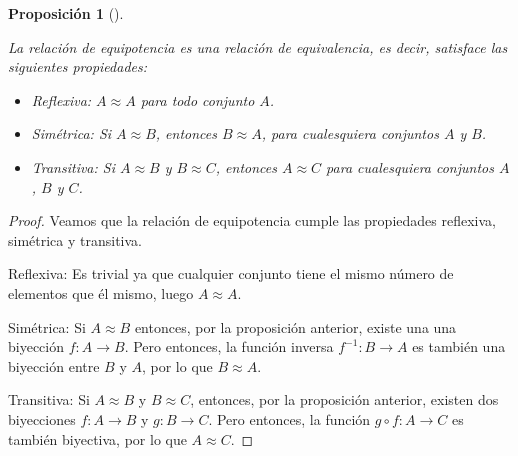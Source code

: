 \documentclass[
  a4paper,
]{scrreport}
\providecommand{\tightlist}{%
  \setlength{\itemsep}{0pt}\setlength{\parskip}{0pt}}\usepackage{longtable,booktabs,array}
\theoremstyle{definition}
\theoremstyle{plain}
\theoremstyle{plain}
\newtheorem{proposition}{Proposición}[chapter]
\theoremstyle{definition}
\theoremstyle{definition}
\theoremstyle{plain}
\theoremstyle{remark}
\begin{document}
\begin{proposition}[]\protect\hypertarget{prp-equipotencia-relacion-equivalencia}{}\label{prp-equipotencia-relacion-equivalencia}

La relación de equipotencia es una relación de equivalencia, es decir,
satisface las siguientes propiedades:

\begin{itemize}
\tightlist
\item
  \emph{Reflexiva:} \(A\approx A\) para todo conjunto \(A\).
\item
  \emph{Simétrica:} Si \(A\approx B\), entonces \(B\approx A\), para
  cualesquiera conjuntos \(A\) y \(B\).
\item
  \emph{Transitiva:} Si \(A\approx B\) y \(B\approx C\), entonces
  \(A\approx C\) para cualesquiera conjuntos \(A\), \(B\) y \(C\).
\end{itemize}

\end{proposition}

\begin{tcolorbox}[enhanced jigsaw, breakable, title=\textcolor{quarto-callout-note-color}{\faInfo}\hspace{0.5em}{Demostración}, toprule=.15mm, coltitle=black, arc=.35mm, rightrule=.15mm, colframe=quarto-callout-note-color-frame, colbacktitle=quarto-callout-note-color!10!white, toptitle=1mm, titlerule=0mm, leftrule=.75mm, opacityback=0, colback=white, bottomrule=.15mm, bottomtitle=1mm, left=2mm, opacitybacktitle=0.6]

\begin{proof}

Veamos que la relación de equipotencia cumple las propiedades reflexiva,
simétrica y transitiva.

Reflexiva: Es trivial ya que cualquier conjunto tiene el mismo número de
elementos que él mismo, luego \(A\approx A\).

Simétrica: Si \(A\approx B\) entonces, por la proposición anterior,
existe una una biyección \(f:A\longrightarrow B\). Pero entonces, la
función inversa \(f^{-1}:B\longrightarrow A\) es también una biyección
entre \(B\) y \(A\), por lo que \(B\approx A\).

Transitiva: Si \(A\approx B\) y \(B\approx C\), entonces, por la
proposición anterior, existen dos biyecciones \(f:A\longrightarrow B\) y
\(g:B\longrightarrow C\). Pero entonces, la función
\(g\circ f:A\longrightarrow C\) es también biyectiva, por lo que
\(A\approx C\).

\end{proof}

\end{tcolorbox}
\end{document}

